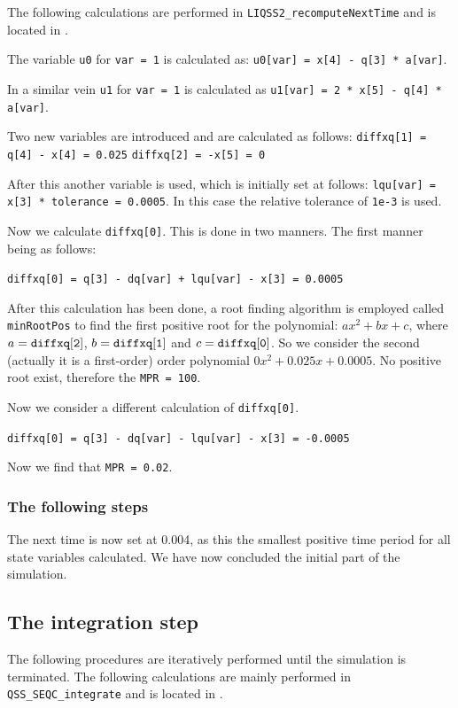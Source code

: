 \documentclass[10pt]{article}
\begin{document}
The following calculations are performed in {\tt{LIQSS2\_recomputeNextTime}} and is located in {}.

The variable {\tt{u0}} for {\tt{var = 1}} is calculated as:  {\tt{u0[var] = x[4] - q[3] * a[var]}}.

In a similar vein {\tt{u1}} for {\tt{var = 1}} is calculated as {\tt{u1[var] = 2 * x[5] - q[4] * a[var]}}.

Two new variables are introduced and are calculated as follows:
{\tt{diffxq[1] = q[4] - x[4] = 0.025}}
{\tt{diffxq[2] = -x[5] = 0}}

After this another variable is used, which is initially set at follows: {\tt{lqu[var] = x[3] * tolerance = 0.0005}}. In this case the relative tolerance of {\tt{1e-3}} is used.

Now we calculate {\tt{diffxq[0]}}. This is done in two manners. The first manner being as follows:

{\tt{diffxq[0] = q[3] - dq[var] + lqu[var] - x[3] = 0.0005}}

After this calculation has been done, a root finding algorithm is employed called {\tt{minRootPos}} to find the first positive root for the polynomial: $ax^2 + bx +c$, where $a = {\tt{diffxq[2]}}$, $b = {\tt{diffxq[1]}}$ and $c = {\tt{diffxq[0]}}$. So we consider the second (actually it is a first-order) order polynomial $0x^2 +0.025x + 0.0005$. No positive root exist, therefore the {\tt{MPR = 100}}.

Now we consider a different calculation of {\tt{diffxq[0]}}.

{\tt{diffxq[0] = q[3] - dq[var] - lqu[var] - x[3] = -0.0005}}

Now we find that {\tt{MPR = 0.02}}.

\subsubsection{The following steps}

The next time is now set at 0.004, as this the smallest positive time period for all state variables calculated. We have now concluded the initial part of the simulation.

\subsection{The integration step}

The following procedures are iteratively performed until the simulation is terminated. The following calculations are mainly performed in {\tt{QSS\_SEQC\_integrate}} and is located in {}.
\end{document}
